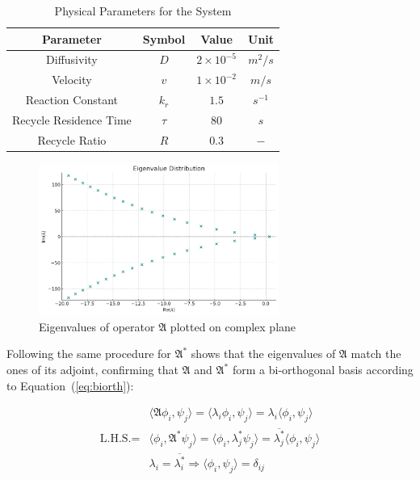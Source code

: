 \begin{table}[ht]
    \centering
    \caption{Physical Parameters for the System}
    \label{tab:pars}
    \begin{tabular}{|c|c|c|c|}
    \hline
    \textbf{Parameter}        & \textbf{Symbol} & \textbf{Value}     & \textbf{Unit}    \\ \hline
    Diffusivity               & $D$             & $2\times10^{-5}$   & ${m^2}/{s}$      \\ \hline
    Velocity                  & $v$             & $1\times10^{-2}$   & ${m}/{s}$        \\ \hline
    Reaction Constant         & $k_r$           & $1.5$              & $s^{-1}$         \\ \hline
    Recycle Residence Time    & $\tau$          & $80$               & $s$              \\ \hline
    Recycle Ratio             & $R$             & $0.3$              & $-$              \\ \hline
    \end{tabular}
\end{table}

\begin{figure}[H]
    \centering
    \includegraphics[width=0.7\textwidth]{Figures/eigval_dist_R_0.3.jpg}
    \caption{Eigenvalues of operator $\mathfrak{A}$ plotted on complex plane}
    \label{fig:eigval_dist}
\end{figure}

Following the same procedure for $\mathfrak{A}^*$ shows that the eigenvalues of $\mathfrak{A}$ match the ones of its adjoint, confirming that $\mathfrak{A}$ and $\mathfrak{A}^*$ form a bi-orthogonal basis according to Equation~(\ref{eq:biorth}):

\begin{equation} \label{eq:biorth}
    \begin{aligned}
        &\langle \mathfrak{A} \phi_i, \psi_j \rangle = \langle \lambda_i \phi_i, \psi_j \rangle = \lambda_i \langle \phi_i, \psi_j \rangle \\
        \text{L.H.S.} = &\langle \phi_i, \mathfrak{A}^* \psi_j \rangle = \langle \phi_i, \lambda_j^* \psi_j \rangle = \overline{\lambda_j^*} \langle \phi_i, \psi_j \rangle \\
        &\lambda_i = \overline{\lambda_i^*} \Rightarrow \langle \phi_i, \psi_j \rangle = \delta_{ij}
    \end{aligned}
\end{equation}

